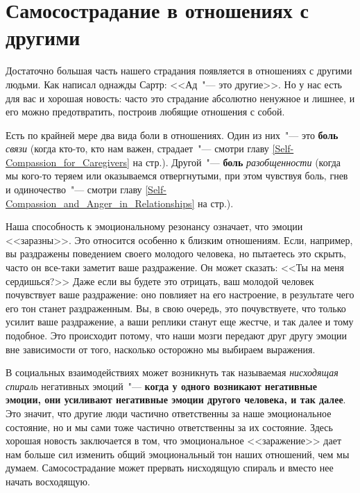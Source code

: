 
\chapter{Самосострадание в отношениях с другими} \label{Self-Compassion_in_Relationships}

Достаточно большая часть нашего страдания появляется в отношениях с другими людьми. Как написал однажды Сартр: <<Ад~"--- это другие>>. Но у нас есть для вас и хорошая новость: часто это страдание абсолютно ненужное и лишнее, и его можно предотвратить, построив любящие отношения с собой. 

Есть по крайней мере два вида боли в отношениях. Один из них~"--- это \textbf{боль} \emph{связи} (когда кто-то, кто нам важен, страдает~"--- смотри главу \ref{Self-Compassion_for_Caregivers} на стр.\:\pageref{Self-Compassion_for_Caregivers}). Другой~"--- \textbf{боль} \emph{разобщенности} (когда мы кого-то теряем или оказываемся отвергнутыми, при этом чувствуя боль, гнев и одиночество~"--- смотри главу \ref{Self-Compassion_and_Anger_in_Relationships} на стр.\:\pageref{Self-Compassion_and_Anger_in_Relationships}).

Наша способность к эмоциональному резонансу означает, что эмоции <<заразны>>. Это относится особенно к близким отношениям. Если, например, вы раздражены поведением своего молодого человека, но пытаетесь это скрыть, часто он все-таки заметит ваше раздражение. Он может сказать: <<Ты на меня сердишься?>> Даже если вы будете это отрицать, ваш молодой человек почувствует ваше раздражение: оно повлияет на его настроение, в результате чего его тон станет раздраженным. Вы, в свою очередь, это почувствуете, что только усилит ваше раздражение, а ваши реплики станут еще жестче, и так далее и тому подобное. Это происходит потому, что наши мозги передают друг другу эмоции вне зависимости от того, насколько осторожно мы выбираем выражения. 

В социальных взаимодействиях может возникнуть так называемая \emph{нисходящая спираль} негативных эмоций~"--- \textbf{когда у одного возникают негативные эмоции, они усиливают негативные эмоции другого человека, и так далее}. Это значит, что другие люди частично ответственны за наше эмоциональное состояние, но и мы сами тоже частично ответственны за их состояние. Здесь хорошая новость заключается в том, что эмоциональное <<заражение>> дает нам больше сил изменить общий эмоциональный тон наших отношений, чем мы думаем. Самосострадание может прервать нисходящую спираль и вместо нее начать восходящую. 

